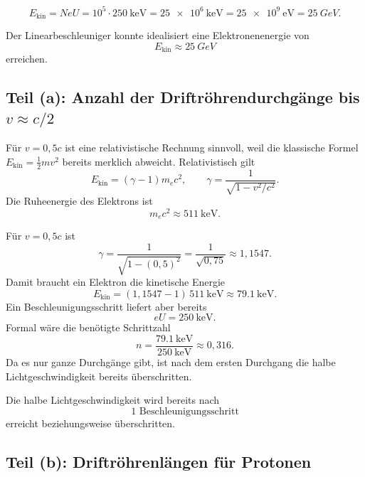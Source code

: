 \documentclass[11pt,a4paper]{scrartcl}
\newcommand{\GeV}{\si{GeV}}
\theoremstyle{definition}
\theoremstyle{plain}
\theoremstyle{remark}
\begin{document}
\begin{calculationbox}[title=Energie nach \(10^5\) Beschleunigungsschritten]
\[
    E_{\mathrm{kin}}
    = N e U
    = 10^5 \cdot \SI{250}{\kilo\electronvolt}
    = \SI{25e6}{\kilo\electronvolt}
    = \SI{25e9}{\electronvolt}
    = \SI{25}{\GeV}.
\]
\end{calculationbox}

\begin{answerbox}
Der Linearbeschleuniger konnte idealisiert eine Elektronenenergie von
\[
    \boxed{E_{\mathrm{kin}} \approx \SI{25}{\GeV}}
\]
erreichen.
\end{answerbox}

\subsection{Teil (a): Anzahl der Driftröhrendurchgänge bis \(v\approx c/2\)}

\begin{learningbox}
Für \(v=0{,}5c\) ist eine relativistische Rechnung sinnvoll, weil die klassische Formel \(E_{\mathrm{kin}}=\frac12 mv^2\) bereits merklich abweicht. Relativistisch gilt
\[
    E_{\mathrm{kin}}=(\gamma-1)m_ec^2,
    \qquad
    \gamma = \frac{1}{\sqrt{1-v^2/c^2}}.
\]
Die Ruheenergie des Elektrons ist
\[
    m_ec^2 \approx \SI{511}{\kilo\electronvolt}.
\]
\end{learningbox}

\begin{calculationbox}
Für \(v=0{,}5c\) ist
\[
    \gamma = \frac{1}{\sqrt{1-(0{,}5)^2}}
    = \frac{1}{\sqrt{0{,}75}}
    \approx 1{,}1547.
\]
Damit braucht ein Elektron die kinetische Energie
\[
    E_{\mathrm{kin}}
    = (1{,}1547-1)\,\SI{511}{\kilo\electronvolt}
    \approx \SI{79,1}{\kilo\electronvolt}.
\]
Ein Beschleunigungsschritt liefert aber bereits
\[
    eU = \SI{250}{\kilo\electronvolt}.
\]
Formal wäre die benötigte Schrittzahl
\[
    n = \frac{\SI{79,1}{\kilo\electronvolt}}{\SI{250}{\kilo\electronvolt}}
    \approx 0{,}316.
\]
Da es nur ganze Durchgänge gibt, ist nach dem ersten Durchgang die halbe Lichtgeschwindigkeit bereits überschritten.
\end{calculationbox}

\begin{answerbox}
Die halbe Lichtgeschwindigkeit wird bereits nach
\[
    \boxed{1\text{ Beschleunigungsschritt}}
\]
erreicht beziehungsweise überschritten.
\end{answerbox}

\subsection{Teil (b): Driftröhrenlängen für Protonen}
\end{document}
